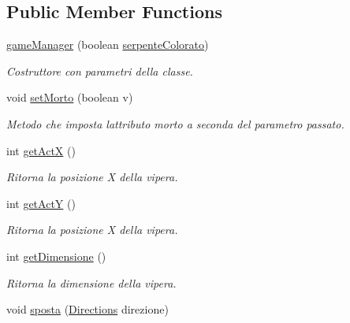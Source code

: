 \subsection*{Public Member Functions}
\begin{DoxyCompactItemize}
\item 
\mbox{\hyperlink{class_snake_1_1game_1_1utility_1_1game_manager_a5751151adac49c0b87fa547f5e366dd9}{game\+Manager}} (boolean \mbox{\hyperlink{class_snake_1_1game_1_1utility_1_1game_manager_a23cfb877f1f20af97a29e6f61424aa80}{serpente\+Colorato}})
\begin{DoxyCompactList}\small\item\em Costruttore con parametri della classe. \end{DoxyCompactList}\item 
void \mbox{\hyperlink{class_snake_1_1game_1_1utility_1_1game_manager_a05b55f5dcc088b5655c5ff77c01f37ea}{set\+Morto}} (boolean v)
\begin{DoxyCompactList}\small\item\em Metodo che imposta l\textquotesingle{}attributo morto a seconda del parametro passato. \end{DoxyCompactList}\item 
int \mbox{\hyperlink{class_snake_1_1game_1_1utility_1_1game_manager_ae853a40673c27fff3315c5213c749814}{get\+ActX}} ()
\begin{DoxyCompactList}\small\item\em Ritorna la posizione X della vipera. \end{DoxyCompactList}\item 
int \mbox{\hyperlink{class_snake_1_1game_1_1utility_1_1game_manager_ae336e912feaec4a5e82fca472bde7f8f}{get\+ActY}} ()
\begin{DoxyCompactList}\small\item\em Ritorna la posizione X della vipera. \end{DoxyCompactList}\item 
int \mbox{\hyperlink{class_snake_1_1game_1_1utility_1_1game_manager_acda812adf1e0abdaf30cf3a2e2efaa07}{get\+Dimensione}} ()
\begin{DoxyCompactList}\small\item\em Ritorna la dimensione della vipera. \end{DoxyCompactList}\item 
void \mbox{\hyperlink{class_snake_1_1game_1_1utility_1_1game_manager_a9837912437f9fefee6140800ce8d6d76}{sposta}} (\mbox{\hyperlink{enum_snake_1_1game_1_1utility_1_1_directions}{Directions}} direzione)

\end{DoxyCompactItemize}

